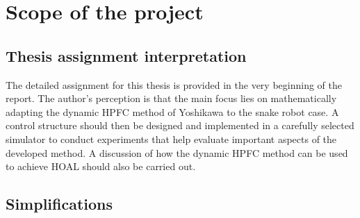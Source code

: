 \section{Scope of the project}

\subsection{Thesis assignment interpretation}

The detailed assignment for this thesis is provided in the very beginning of the report. The author's perception is that the main focus lies on mathematically adapting the dynamic HPFC method of Yoshikawa \cite{yoshikawa1987dynamic} to the snake robot case. A control structure should then be designed and implemented in a carefully selected simulator to conduct experiments that help evaluate important aspects of the developed method. A discussion of how the dynamic HPFC method can be used to achieve HOAL should also be carried out.





\subsection{Simplifications}

